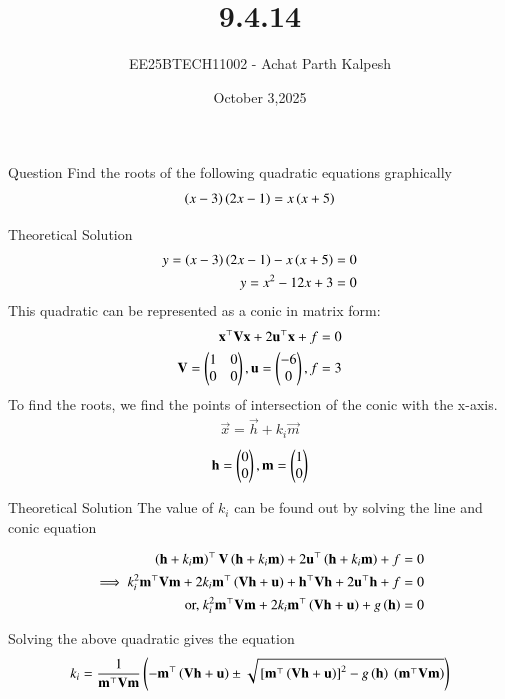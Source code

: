 \documentclass{beamer}
\title %
{9.4.14}
\date{October 3,2025}
\author %
{EE25BTECH11002 - Achat Parth Kalpesh}
\begin{document}
\frame{\titlepage}

\begin{frame}{Question}
Find the roots of the following quadratic equations graphically
\begin{align}
    \left(x-3\right)\left(2x-1\right)=x\left(x+5\right)
\end{align}
\end{frame}

\begin{frame}{Theoretical Solution}
\begin{align}
    y = \left(x-3\right)\left(2x-1\right)-x\left(x+5\right) = 0\\
    y = x^2 - 12x + 3 = 0
\end{align}
This quadratic can be represented as a conic in matrix form:
\begin{align}
   \mathbf{x}^{\top}\mathbf{V}\mathbf{x} + 2\mathbf{u}^{\top}\mathbf{x} + f = 0\\ 
   \mathbf{V} = \begin{pmatrix}1 & 0 \\ 0 & 0\end{pmatrix} , \mathbf{u} = \begin{pmatrix}-6 \\0\end{pmatrix} ,
   f = 3
\end{align}
To find the roots, we find the points of intersection of the conic with the x-axis.
\begin{align}
\vec{x} = \vec{h} + k_i\vec{m}    
\end{align}
\begin{align}
\mathbf{h}=\begin{pmatrix}0 \\ 0\end{pmatrix}, \mathbf{m} = \begin{pmatrix}1 \\ 0\end{pmatrix}
\end{align}
\end{frame}


\begin{frame}{Theoretical Solution}
The value of $k_i$ can be found out by solving the line and conic equation

\begin{align}
\left(\mathbf{h} + k_i \mathbf{m}\right)^{\top} \mathbf{V} \left(\mathbf{h} + k_i \mathbf{m}\right) + 2\mathbf{u}^{\top} \left(\mathbf{h} + k_i \mathbf{m}\right) + f &= 0 \\
\implies k_i^{2} \mathbf{m}^{\top}\mathbf{V}\mathbf{m} + 2k_i \mathbf{m}^{\top} \left(\mathbf{V}\mathbf{h} + \mathbf{u}\right) + \mathbf{h}^{\top}\mathbf{V}\mathbf{h} + 2\mathbf{u}^{\top}\mathbf{h} + f &= 0 \\
\text{or, } k_i^{2} \mathbf{m}^{\top}\mathbf{V}\mathbf{m} + 2k_i \mathbf{m}^{\top} \left(\mathbf{V}\mathbf{h} + \mathbf{u}\right) + g\left(\mathbf{h}\right) &= 0
\end{align}

Solving the above quadratic gives the equation
\begin{align}
k_i = \frac{1}{\mathbf{m}^{\top}\mathbf{V}\mathbf{m}}
\left(
    -\mathbf{m}^{\top} \left(\mathbf{V}\mathbf{h} + \mathbf{u}\right)
    \pm
    \sqrt{ {}\left[\mathbf{m}^{\top}\left(\mathbf{V}\mathbf{h} + \mathbf{u}\right)\right]^2
    - g\left(\mathbf{h}\right) \ \left(\mathbf{m}^{\top}\mathbf{V}\mathbf{m}\right) }
    \right)
\end{align}
\end{frame}
\end{document}
